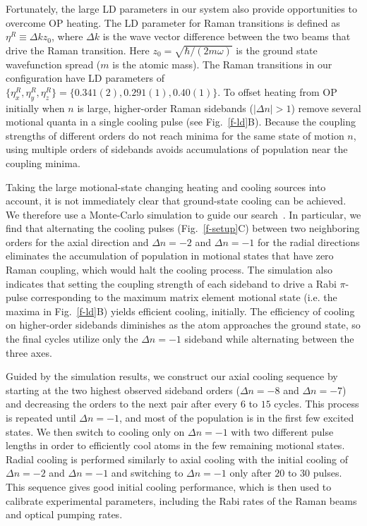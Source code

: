 \documentclass[aps,prl,twocolumn,groupedaddress]{revtex4-1}
\begin{document}
Fortunately, the large LD parameters in our system also provide opportunities to overcome OP heating.
The LD parameter for Raman transitions is defined as $\eta^R\equiv\Delta k z_0$,
where $\Delta k$ is the wave vector difference
between the two beams that drive the Raman transition.  Here $z_0=\sqrt{\hbar/(2 m \omega)}$ is the ground state wavefunction spread ($m$ is the atomic mass).
The Raman transitions in our configuration have LD parameters of
$\{\eta^R_x,\eta^R_y,\eta^R_z\} = \{0.341(2), 0.291(1), 0.40(1)\}$.
To offset heating from OP initially when $n$ is large, higher-order Raman  sidebands ($|\Delta n| > 1$)   remove several motional quanta in a single cooling pulse (see Fig.~\ref{f-ld}B).
Because the coupling strengths of different orders do not reach minima for the same state of motion $n$,
using multiple orders of sidebands avoids accumulations of population
near the coupling minima.

Taking the large motional-state changing heating and cooling sources
 into account,
it is not immediately clear that ground-state cooling can be achieved.
We therefore use a Monte-Carlo simulation to guide our search~\cite{Dalibard1992}.
In particular, we find that alternating the cooling pulses (Fig.~\ref{f-setup}C) between two
neighboring orders for the axial direction and $\Delta n=-2$ and $\Delta n=-1$ for the radial directions
eliminates the accumulation of population in motional states that have zero Raman coupling, which would halt the cooling process.
The simulation also indicates that setting the coupling strength of each  sideband
to drive a Rabi $\pi$-pulse corresponding to the maximum matrix element motional state
(i.e. the maxima in Fig.~\ref{f-ld}B)  yields efficient cooling, initially.
The efficiency of cooling on higher-order sidebands diminishes
as the atom approaches the ground state, so the final  cycles utilize only the $\Delta n=-1$ sideband while alternating between the three  axes.

Guided by the simulation results,
we construct our axial cooling sequence by starting at the two highest
observed  sideband orders ($\Delta n=-8$ and $\Delta n=-7$)
and decreasing the orders to the next pair after every $6$ to $15$ cycles.
This process is repeated until  $\Delta n=-1$, and most of the
population is in the first few excited states. We then switch to cooling only on $\Delta n=-1$ with two different pulse lengths in order to efficiently cool atoms in the
few remaining motional states.
Radial cooling is performed similarly to  axial cooling with the initial cooling of $\Delta n=-2$ and $\Delta n=-1$ and switching to $\Delta n=-1$ only after $20$ to $30$ pulses.
This sequence gives good initial cooling performance, which is then used to calibrate experimental
parameters, including the Rabi rates of the Raman beams and optical pumping rates.
\end{document}
